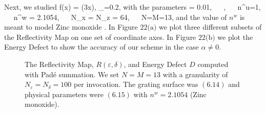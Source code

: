 \vspace{-19mm}
\hspace{-6.8mm} Next, we studied
\be
f(x) = \sin(3x),
\quad
\varepsilon_{}=0.2,
\ee
with the parameters
\vspace{-0.4mm}
\be
\alpha = 0.01,
~~
,
~~
n^u=1,
~~
n^w = 2.1054,
~~
N_x = N_z = 64,
~~
N=M=13,
\ee
\vspace{-0.4mm}
\hspace{-2mm}and the value of $n^w$ is meant to model Zinc monoxide \cite{bond1965measurement}.
In Figure $22\text{(a)}$ we plot three different subsets of the Reflectivity
Map on one set of coordinate axes. In Figure $22\text{(b)}$ we plot the 
Energy Defect to show the accuracy of our scheme in the case $\alpha \neq 0$.
%
%
\vspace{-22.3mm}
\begin{figure}[H]
    \centering
    \caption{The Reflectivity Map, $R(\varepsilon,\delta)$, and Energy Defect
    $D$ computed with Pad\'e summation. We set 
    $N=M=13$ with a granularity of $N_{\varepsilon}=N_{\delta}=100$ per 
    invocation. The grating surface was $(6.14)$ and physical parameters were $(6.15)$ with $n^w=2.1054$ (Zinc monoxide).}
    \label{Fig:RM:Flint}
\end{figure}
